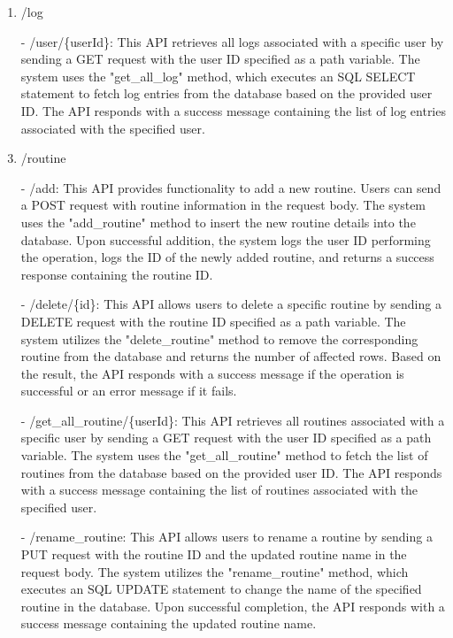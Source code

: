 \begin{enumerate}
    \item /log
    \item[-] /user/\{userId\}: This API retrieves all logs associated with a specific user by sending a GET request with the user ID specified as a path variable. The system uses the "get\_all\_log" method, which executes an SQL SELECT statement to fetch log entries from the database based on the provided user ID. The API responds with a success message containing the list of log entries associated with the specified user.\\

    \item /routine
    \item[-] /add: This API provides functionality to add a new routine. Users can send a POST request with routine information in the request body. The system uses the "add\_routine" method to insert the new routine details into the database. Upon successful addition, the system logs the user ID performing the operation, logs the ID of the newly added routine, and returns a success response containing the routine ID.\\
    \item[-] /delete/\{id\}: This API allows users to delete a specific routine by sending a DELETE request with the routine ID specified as a path variable. The system utilizes the "delete\_routine" method to remove the corresponding routine from the database and returns the number of affected rows. Based on the result, the API responds with a success message if the operation is successful or an error message if it fails.\\
    \item[-] /get\_all\_routine/\{userId\}: This API retrieves all routines associated with a specific user by sending a GET request with the user ID specified as a path variable. The system uses the "get\_all\_routine" method to fetch the list of routines from the database based on the provided user ID. The API responds with a success message containing the list of routines associated with the specified user.\\
    \item[-] /rename\_routine: This API allows users to rename a routine by sending a PUT request with the routine ID and the updated routine name in the request body. The system utilizes the "rename\_routine" method, which executes an SQL UPDATE statement to change the name of the specified routine in the database. Upon successful completion, the API responds with a success message containing the updated routine name.\\

\end{enumerate}
